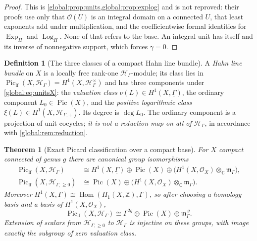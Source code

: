 \documentclass[11pt,letterpaper]{article}
\newtheorem{theorem}{Theorem}[section]
\theoremstyle{definition}
\newtheorem{definition}[definition]{Definition}
\theoremstyle{remark}
\newcommand{\C}{\mathbb C}
\newcommand{\Z}{\mathbb Z}
\newcommand{\OO}{\mathcal O}
\newcommand{\HH}{\mathscr H_\Gamma}
\newcommand{\HP}{\mathscr H_{\Gamma,+}}
\newcommand{\HI}{\mathscr H_{\Gamma,\ge0}}
\newcommand{\mK}{\mathfrak m_\Gamma}
\newcommand{\Pic}{\operatorname{Pic}}
\newcommand{\Piclf}{\operatorname{Pic}_{\mathrm{lf}}}
\newcommand{\ExpH}{\operatorname{Exp}_{H}}
\newcommand{\LogH}{\operatorname{Log}_{H}}
\newcommand{\Hom}{\operatorname{Hom}}
\numberwithin{equation}{section}
\begin{document}
\begin{proof}
This is \cref{global:prop:units,global:prop:explog} and is not reproved: their proofs use only that $\OO(U)$ is an integral domain on a connected $U$, that least exponents add under multiplication, and the coefficientwise formal identities for $\ExpH$ and $\LogH$. None of that refers to the base. An integral unit has itself and its inverse of nonnegative support, which forces $\gamma=0$.
\end{proof}

\begin{definition}[The three classes of a compact Hahn line bundle]\label{global:def:threeclasses}
A \emph{Hahn line bundle} on $X$ is a locally free rank-one $\HH$-module; its class lies in $\Piclf(X,\HH)=H^1(X,\HH^\times)$ and has three components under \eqref{global:eq:unitsX}: the \emph{valuation class} $\nu(L)\in H^1(X,\underline\Gamma)$, the ordinary component $L_0\in\Pic(X)$, and the \emph{positive logarithmic class} $\xi(L)\in H^1(X,\HP)$. Its degree is $\deg L_0$. The ordinary component is a projection of unit cocycles; \emph{it is not a reduction map on all of $\HH$}, in accordance with \cref{global:rem:reduction}.
\end{definition}

\begin{theorem}[Exact Picard classification over a compact base]\label{global:thm:piccompact}
For $X$ compact connected of genus $g$ there are canonical group isomorphisms
\begin{align}
  \Piclf(X,\HH)&\cong H^1(X,\underline\Gamma)\oplus\Pic(X)
       \oplus\bigl(H^1(X,\OO_X)\otimes_\C\mK\bigr),\label{global:eq:picmain}\\
  \Piclf(X,\HI)&\cong\Pic(X)\oplus\bigl(H^1(X,\OO_X)\otimes_\C\mK\bigr).
  \label{global:eq:picintegral}
\end{align}
Moreover $H^1(X,\underline\Gamma)\cong\Hom(H_1(X,\Z),\Gamma)$, so after choosing a homology basis and a basis of $H^1(X,\OO_X)$,
\begin{equation}\label{global:eq:piccoordinates}
  \Piclf(X,\HH)\cong\Gamma^{2g}\oplus\Pic(X)\oplus\mK^{\,g}.
\end{equation}
Extension of scalars from $\HI$ to $\HH$ is injective on these groups, with image exactly the subgroup of zero valuation class.
\end{theorem}
\end{document}
